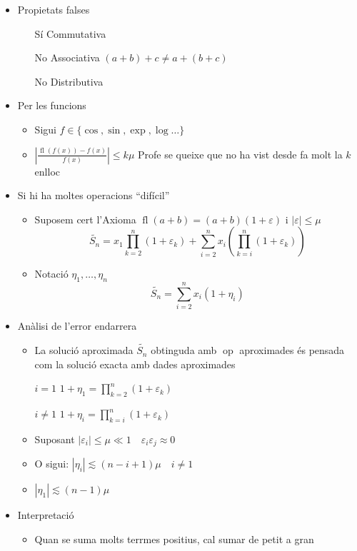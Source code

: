 \documentclass{article}
\DeclareMathOperator{\op}{op}
\DeclareMathOperator{\fl}{fl}
\begin{document}
\begin{itemize}
\item Propietats falses
	\begin{itemize}
	\item[Sí] Commutativa
	\item[No] Associativa $(a+b)+c \neq a+(b+c)$
	\item[No] Distributiva
	\end{itemize}

\item Per les funcions
	\begin{itemize}
	\item Sigui $f \in \{ \cos, \sin, \exp, \log \dots \}$
	\item $\left|\frac{\fl(f(x)) - f(x)}{f(x)}\right| \le k\mu$
		\subitem Profe se queixe que no ha vist desde fa molt la $k$ enlloc
	\end{itemize}
\item Si hi ha moltes operacions ``difícil''
	\begin{itemize}
	\item Suposem cert l'Axioma $\fl(a+b) = (a+b)(1+\varepsilon)$ i $|\varepsilon| \le \mu$
	$$\widetilde{S_n} = x_1 \prod_{k=2}^n (1 + \varepsilon_k) + \sum_{i = 2}^n x_i\left(\prod_{k = i}^n (1+ \varepsilon_k)\right)$$
	\item Notació $\eta_1, \dots, \eta_n$
	$$\widetilde{S_n} = \sum_{i=2}^n x_i(1 + \eta_i)$$
	\end{itemize}

\item Anàlisi de l'error endarrera
	\begin{itemize}
	\item La solució aproximada $\widetilde{S_n}$ obtinguda amb $\op$ aproximades és pensada com la solució exacta amb dades aproximades
	\item[$i = 1$] $1+\eta_1 = \prod_{k=2}^n (1 + \varepsilon_k)$
	\item[$i \neq 1$] $1+\eta_i = \prod_{k=i}^n (1 + \varepsilon_k)$
	\item Suposant $|\varepsilon_i| \le \mu \ll 1 \quad \varepsilon_i \varepsilon_j \approx 0$
	\item O sigui: $|\eta_i| \lesssim (n -i +1)\mu \quad i \neq 1$
	\item $|\eta_1| \lesssim (n -1)\mu$
	\end{itemize}
\item Interpretació
	\begin{itemize}
	\item Quan se suma molts terrmes positius, cal sumar de petit a gran
	\end{itemize}
\end{itemize}
\end{document}
